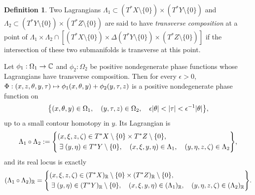 \documentclass[10pt]{amsart}
\theoremstyle{definition}\newtheorem{defi}[theo]{Definition}\newtheorem{rema}[theo]{Remark}\newtheorem{exam}[theo]{Example}\newtheorem{exem}[theo]{Example}\newtheorem{nota}[theo]{Notation}
\newcommand\1{\mathds{1}}
\newcommand{\R}{\mathbb{R}}
\newcommand{\C}{\mathbb{C}}
\let\oldexists\exists
\renewcommand*{\exists}{\mathrel{\oldexists}}
\renewcommand*{\to}{\mathchoice{\longrightarrow}{\rightarrow}{\rightarrow}{\rightarrow}}
\let\oldmapsto\mapsto
\renewcommand*{\mapsto}{\mathchoice{\longmapsto}{\oldmapsto}{\oldmapsto}{\oldmapsto}}
\let\originalleft\left
\let\originalright\right
\renewcommand{\left}{\mathopen{}\mathclose\bgroup\originalleft}
\renewcommand{\right}{\aftergroup\egroup\originalright}
\begin{document}
\begin{defi}\label{def:composition}
Two Lagrangians $\Lambda_1\subset (T^*X\setminus \{0\})\times (T^*Y\setminus \{0\})$ and $\Lambda_2\subset (T^*Y\setminus \{0\})\times (T^*Z\setminus \{0\})$ are said to have \emph{transverse composition} at a point of $\Lambda_1\times \Lambda_2\cap [(T^*X\setminus \{0\})\times
\Delta(T^*Y\setminus \{0\})\times (T^*Z\setminus \{0\})]$ if the intersection of these two submanifolds is transverse at this point.
\end{defi}

\begin{prop}\label{prop:compo_phase}
Let $\phi_1:\Omega_1\to \C$ and $\phi_2:\Omega_2$ be positive nondegenerate phase functions whose Lagrangians have transverse composition. Then for every $\epsilon>0$, $\Phi: (x,z,\theta,y,\tau)\mapsto \phi_1(x,\theta,y)+\phi_2(y,\tau,z)$ is a positive nondegenerate phase function on
\[
\left\{(x,\theta,y)\in \Omega_1,\quad(y,\tau,z)\in
\Omega_2,\quad\epsilon|\theta|<|\tau|<\epsilon^{-1}|\theta|\right\},
\]
up to a small contour homotopy in $y$. Its Lagrangian is
\begin{equation*}
\Lambda_1\circ \Lambda_2:=\left\{
\begin{aligned}
&(x,\xi,z,\zeta)\in T^*X\setminus
\{0\}\times T^*Z\setminus \{0\},\\
&\exists (y,\eta)\in T^*Y\setminus
\{0\}, \quad(x,\xi,y,\eta)\in \Lambda_1,\quad(y,\eta,z,\zeta)\in
\Lambda_2
\end{aligned}
\right\},
\end{equation*}
and its real locus is exactly
\begin{equation*}
(\Lambda_1\circ \Lambda_2)_\R=\left\{
\begin{aligned}
&(x,\xi,z,\zeta)\in (T^*X)_{\R}\setminus
\{0\}\times (T^*Z)_{\R}\setminus \{0\},\\
&\exists (y,\eta)\in (T^*Y)_{\R}\setminus
\{0\}, \quad(x,\xi,y,\eta)\in (\Lambda_1)_{\R},\quad(y,\eta,z,\zeta)\in (\Lambda_2)_{\R}
\end{aligned}
\right\}.
\end{equation*}
\end{prop}
\end{document}
